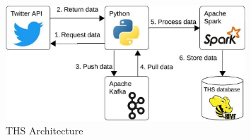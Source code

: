  
  \begin{figure}[!h]
    \centering
        \includegraphics[width=0.8\textwidth]{figures/ths_architecture.jpeg}
        \caption{THS Architecture}
        \label{ths_architecture}
\end{figure}




